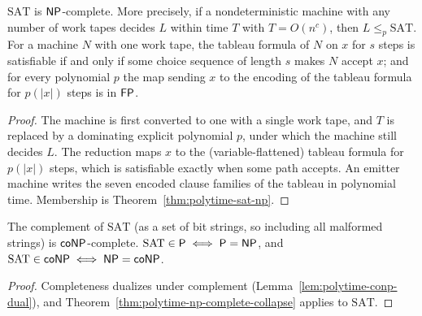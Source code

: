 \begin{theorem}
  \label{thm:cook-levin}
  \leanok
  $\mathrm{SAT}$ is $\mathsf{NP}$-complete. More precisely, if a
  nondeterministic machine with any number of work tapes decides $L$ within
  time $T$ with $T = O(n^c)$, then $L \le_p \mathrm{SAT}$. For a machine $N$
  with one work tape, the tableau formula of $N$ on $x$ for $s$ steps is
  satisfiable if and only if some choice sequence of length $s$ makes $N$
  accept $x$; and for every polynomial $p$ the map sending $x$ to the encoding
  of the tableau formula for $p(|x|)$ steps is in $\mathsf{FP}$.
\end{theorem}
\begin{proof}
  \leanok
  The machine is first converted to one with a single work tape, and $T$ is
  replaced by a dominating explicit polynomial $p$, under which the machine
  still decides $L$. The reduction maps $x$ to the (variable-flattened)
  tableau formula for $p(|x|)$ steps, which is satisfiable exactly when some
  path accepts. An emitter machine writes the seven encoded clause families of
  the tableau in polynomial time. Membership is
  Theorem~\ref{thm:polytime-sat-np}.
\end{proof}

\begin{corollary}
  \label{cor:polytime-sat-consequences}
  \leanok
  The complement of $\mathrm{SAT}$ (as a set of bit strings, so including all
  malformed strings) is $\mathsf{coNP}$-complete. $\mathrm{SAT} \in \mathsf{P} \iff
  \mathsf{P} = \mathsf{NP}$, and $\mathrm{SAT} \in \mathsf{coNP} \iff \mathsf{NP} = \mathsf{coNP}$.
\end{corollary}
\begin{proof}
  \leanok
  Completeness dualizes under complement (Lemma~\ref{lem:polytime-conp-dual}),
  and Theorem~\ref{thm:polytime-np-complete-collapse} applies to
  $\mathrm{SAT}$.
\end{proof}

